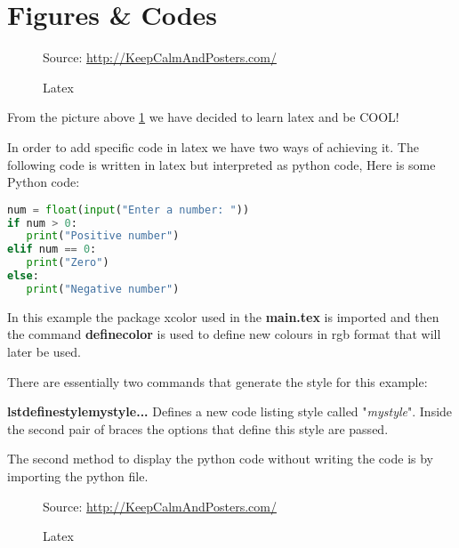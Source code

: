 \section{Figures \& Codes}
\label{sec:fig}

\begin{figure}[thb]
\centering

%
{\scriptsize%
            Source: \url{http://KeepCalmAndPosters.com/}}
\caption{Latex}
\label{fig:learnLatex}
\end{figure}
From the picture above \ref{fig:learnLatex} we have decided to learn latex and be COOL!

In order to add specific code in latex we have two ways of achieving it. The following code is written in latex but interpreted as python code,
\lstset{style=mystyle} 
Here is some Python code:
\begin{lstlisting}[language=Python, caption= Python Example Code]
num = float(input("Enter a number: "))
if num > 0:
   print("Positive number")
elif num == 0:
   print("Zero")
else:
   print("Negative number")
\end{lstlisting}
In this example the package xcolor used in the \textbf{main.tex} is imported and then the command \textbf{definecolor{}{}{}} is used to define new colours in rgb format that will later be used. 

There are essentially two commands that generate the style for this example:

\textbf{lstdefinestyle{mystyle}{...}}
Defines a new code listing style called "\textit{mystyle}". Inside the second pair of braces the options that define this style are passed.

The second method to display the python code without writing the code is by importing the python file. 



\clearpage

\lipsum[1-2]


\begin{figure}[thb]
\centering

%
{\scriptsize%
            Source: \url{http://KeepCalmAndPosters.com/}}
\caption{Latex}
\label{fig:learnLatexCompleteSize}
\end{figure}

